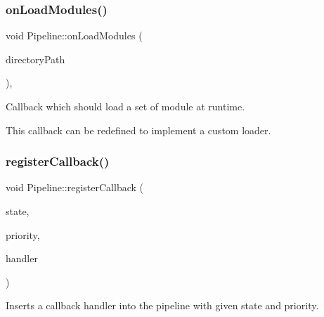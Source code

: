 \subsubsection{\texorpdfstring{onLoadModules()}{onLoadModules()}}
{\footnotesize\ttfamily void Pipeline\+::on\+Load\+Modules (\begin{DoxyParamCaption}\item[{const std\+::string \&}]{directory\+Path }\end{DoxyParamCaption})\hspace{0.3cm}{\ttfamily [protected]}, {\ttfamily [virtual]}}



Callback which should load a set of module at runtime. 

This callback can be redefined to implement a custom loader. \mbox{\label{classo_z_1_1_pipeline_a869b02b2b8953993ccfb882a3e1f3a0f}} 
\subsubsection{\texorpdfstring{registerCallback()}{registerCallback()}\hspace{0.1cm}{\footnotesize\ttfamily [1/2]}}
{\footnotesize\ttfamily void Pipeline\+::register\+Callback (\begin{DoxyParamCaption}\item[{\mbox{\hyperlink{namespaceo_z_a356b278f7c65def0cae75fca8cae268e}{State}}}]{state,  }\item[{\mbox{\hyperlink{namespaceo_z_af05a92eb185d18369e9b4acdcd9dcd12}{Priority}}}]{priority,  }\item[{\mbox{\hyperlink{classo_z_1_1_pipeline_a5a71ea2f2d4be5b82589c1b8175722f4}{Callback\+Handler}} \&\&}]{handler }\end{DoxyParamCaption})}



Inserts a callback handler into the pipeline with given state and priority. 

\mbox{\label{classo_z_1_1_pipeline_af6d96b2697aa6770a3f1dd205b12c1c3}} 
